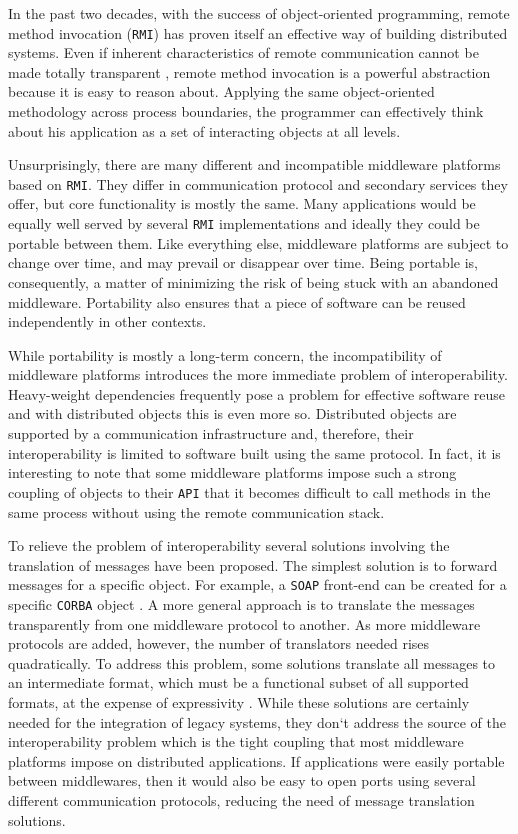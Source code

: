 In the past two decades, with the success of object-oriented
programming, remote method invocation (\texttt{RMI}) has proven itself an effective way of building
distributed systems. Even if inherent characteristics of remote communication cannot be made totally
transparent \cite{Kendall}, remote method invocation is a powerful abstraction because it is easy to
reason about. Applying the same object-oriented methodology across process boundaries, the programmer
can effectively think about his application as a set of interacting objects at all levels.

Unsurprisingly, there are many different and incompatible middleware platforms based on \texttt{RMI}.
They differ in communication protocol and secondary services they offer, but core functionality is mostly
the same. Many applications would be equally well served by several \texttt{RMI} implementations and
ideally they could be portable between them. Like everything else, middleware platforms are subject to
change over time, and may prevail or disappear over time. Being portable is, consequently, a matter of
minimizing the risk of being stuck with an abandoned middleware. Portability also ensures that a piece
of software can be reused independently in other contexts.

While portability is mostly a long-term concern, the incompatibility of middleware platforms introduces
the more immediate problem of interoperability. Heavy-weight dependencies frequently pose a problem
for effective software reuse and with distributed objects this is even more so. Distributed objects are supported
by a communication infrastructure and, therefore, their interoperability is limited to software built using the
same protocol. In fact, it is interesting to note that some middleware platforms impose such a strong coupling of objects to
their \texttt{API} that it becomes difficult to call methods in the same process without using the remote communication stack.

To relieve the problem of interoperability several solutions involving the translation of messages have been
proposed. The simplest solution is to forward messages for a specific object. For example, a \texttt{SOAP} front-end can
be created for a specific \texttt{CORBA} object \cite{soap, corba}. A more general approach is to translate the messages transparently
from one middleware protocol to another. As more middleware protocols are added, however, the number of translators
needed rises quadratically. To address this problem, some solutions translate all messages to an intermediate format,
which must be a functional subset of all supported formats, at the expense of expressivity \cite{Flores, Issarny, Bennaceur, Bromberg, Nakazawa}. While these solutions
are certainly needed for the integration of legacy systems, they don`t address the source of the interoperability
problem which is the tight coupling that most middleware platforms impose on distributed applications. If applications were
easily portable between middlewares, then it would also be easy to open ports using several different communication
protocols, reducing the need of message translation solutions.

